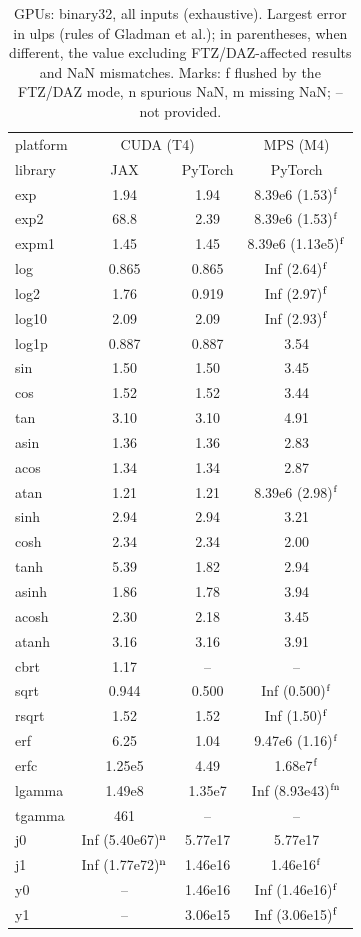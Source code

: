 \begin{table}
\centering
\begin{small}
\begin{tabular}{|l|cc|c|}
\hline
platform & \multicolumn{2}{c|}{CUDA (T4)} & \multicolumn{1}{c|}{MPS (M4)} \\
library & JAX & PyTorch & PyTorch \\ \hline
exp & 1.94 & 1.94 & 8.39e6 (1.53)$^{\rm f}$ \\
exp2 & 68.8 & 2.39 & 8.39e6 (1.53)$^{\rm f}$ \\
expm1 & 1.45 & 1.45 & 8.39e6 (1.13e5)$^{\rm f}$ \\
log & 0.865 & 0.865 & Inf (2.64)$^{\rm f}$ \\
log2 & 1.76 & 0.919 & Inf (2.97)$^{\rm f}$ \\
log10 & 2.09 & 2.09 & Inf (2.93)$^{\rm f}$ \\
log1p & 0.887 & 0.887 & 3.54 \\
sin & 1.50 & 1.50 & 3.45 \\
cos & 1.52 & 1.52 & 3.44 \\
tan & 3.10 & 3.10 & 4.91 \\
asin & 1.36 & 1.36 & 2.83 \\
acos & 1.34 & 1.34 & 2.87 \\
atan & 1.21 & 1.21 & 8.39e6 (2.98)$^{\rm f}$ \\
sinh & 2.94 & 2.94 & 3.21 \\
cosh & 2.34 & 2.34 & 2.00 \\
tanh & 5.39 & 1.82 & 2.94 \\
asinh & 1.86 & 1.78 & 3.94 \\
acosh & 2.30 & 2.18 & 3.45 \\
atanh & 3.16 & 3.16 & 3.91 \\
cbrt & 1.17 & -- & -- \\
sqrt & 0.944 & 0.500 & Inf (0.500)$^{\rm f}$ \\
rsqrt & 1.52 & 1.52 & Inf (1.50)$^{\rm f}$ \\
erf & 6.25 & 1.04 & 9.47e6 (1.16)$^{\rm f}$ \\
erfc & 1.25e5 & 4.49 & 1.68e7$^{\rm f}$ \\
lgamma & 1.49e8 & 1.35e7 & Inf (8.93e43)$^{\rm fn}$ \\
tgamma & 461 & -- & -- \\
j0 & Inf (5.40e67)$^{\rm n}$ & 5.77e17 & 5.77e17 \\
j1 & Inf (1.77e72)$^{\rm n}$ & 1.46e16 & 1.46e16$^{\rm f}$ \\
y0 & -- & 1.46e16 & Inf (1.46e16)$^{\rm f}$ \\
y1 & -- & 3.06e15 & Inf (3.06e15)$^{\rm f}$ \\
\hline
\end{tabular}
\end{small}
\caption{GPUs: binary32, all inputs (exhaustive). Largest error in ulps (rules of Gladman et al.); in parentheses, when different, the value excluding FTZ/DAZ-affected results and NaN mismatches. Marks: f flushed by the FTZ/DAZ mode, n spurious NaN, m missing NaN; -- not provided.}
\label{tab:b32gpu}
\end{table}

